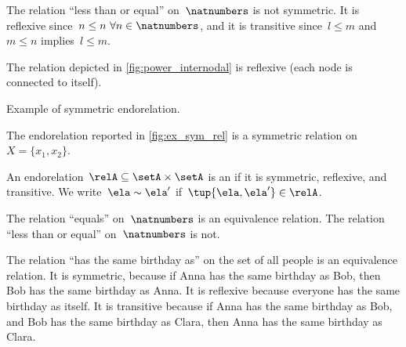 \begin{example}
    The relation ``less than or equal'' on~$\natnumbers$ is not symmetric. It is reflexive since~$n\leq n \ \forall n\in \natnumbers$, and it is transitive since~$l\leq m$ and~$m\leq n$ implies~$l\leq m$.
\end{example}

\begin{example}
    The relation depicted in \cref{fig:power_internodal} is reflexive (each node is connected to itself).
\end{example}
\begin{marginfigure}
    \begin{center}
    \end{center}
    \caption{Example of symmetric endorelation.}
    \label{fig:ex_sym_rel}
\end{marginfigure}
\begin{example}
    The endorelation reported in \cref{fig:ex_sym_rel} is a symmetric relation on~$X=\{x_1,x_2\}$.
\end{example}

\devel{ }%

\begin{definition}
    \label{def:equivalence-relation}
    An endorelation~$\relA\subseteq \setA\times \setA$ is an \emph{} if it is symmetric, reflexive, and transitive. We write~$\ela\sim \ela'$ if~$\tup{\ela,\ela'}\in \relA$.
\end{definition}

\begin{example}
    The relation ``equals'' on~$\natnumbers$ is an equivalence relation.
    The relation ``less than or equal'' on~$\natnumbers$ is not.
\end{example}

\begin{example}
    The relation ``has the same birthday as'' on the set of all people is an equivalence relation.
    It is symmetric, because if Anna has the same birthday as Bob, then Bob has the same birthday as Anna.
    It is reflexive because everyone has the same birthday as itself.
    It is transitive because if Anna has the same birthday as Bob, and Bob has the same birthday as Clara, then Anna has the same birthday as Clara.
\end{example}

